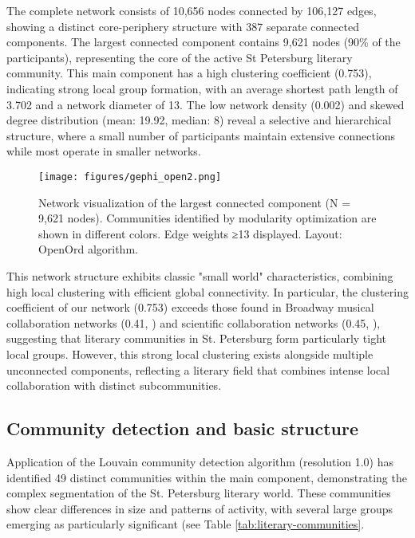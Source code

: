 \documentclass{jcls}
\begin{document}
The complete network consists of 10,656 nodes connected by 106,127 edges, showing a distinct core-periphery structure with 387 separate connected components. The largest connected component contains 9,621 nodes (90\% of the participants), representing the core of the active St Petersburg literary community. This main component has a high clustering coefficient (0.753), indicating strong local group formation, with an average shortest path length of 3.702 and a network diameter of 13. The low network density (0.002) and skewed degree distribution (mean: 19.92, median: 8) reveal a selective and hierarchical structure, where a small number of participants maintain extensive connections while most operate in smaller networks. 

\begin{figure}
	\texttt{[image: figures/gephi\_open2.png]}
	\caption{Network visualization of the largest connected component (N = 9,621 nodes). Communities identified by modularity optimization are shown in different colors. Edge weights ≥13 displayed. Layout: OpenOrd algorithm.}
    \label{component}
\end{figure}

This network structure exhibits classic "small world" characteristics, combining high local clustering with efficient global connectivity. In particular, the clustering coefficient of our network (0.753) exceeds those found in Broadway musical collaboration networks (0.41, \cite{uzzi}) and scientific collaboration networks (0.45, \cite{newman}), suggesting that literary communities in St. Petersburg form particularly tight local groups. However, this strong local clustering exists alongside multiple unconnected components, reflecting a literary field that combines intense local collaboration with distinct subcommunities.

\subsection{Community detection and basic structure}
Application of the Louvain community detection algorithm (resolution 1.0) has identified 49 distinct communities within the main component, demonstrating the complex segmentation of the St. Petersburg literary world. These communities show clear differences in size and patterns of activity, with several large groups emerging as particularly significant (see Table \ref{tab:literary-communities}.
\end{document}
